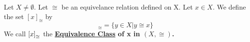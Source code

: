 \label{def:EquivalenceClass}
\newcommand{\EquivalenceClass}[0]{
    \bf \hyperref[def:EquivalenceClass]{Equivalence Class} \rm
}
\newcommand{\EqClass}[2]{
    \bra{#1}_{\cong}
}
\begin{df}
    
    Let $X \neq \emptyset$.
    Let $\cong$ be an equivelance relation defined on X.  
    Let $x \in X$. 
    We define the set $[x]_{\cong}$ by 
    \begin{equation}
        [x]_{\cong} = \{y \in X | y \cong x\}
    \end{equation} 
    We call $\EqClass{x}{\cong}$ the \EquivalenceClass of x in $(X, \cong)$. 
\end{df}